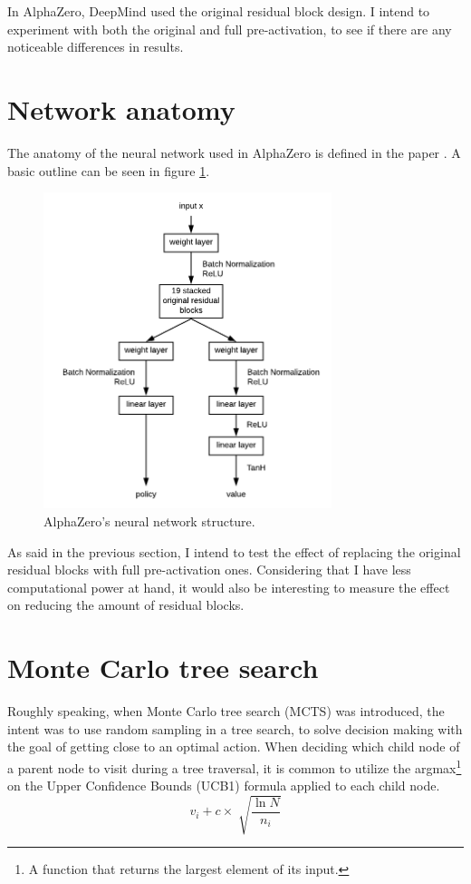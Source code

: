In AlphaZero, DeepMind used the original residual block design. I intend to experiment with both the original and full pre-activation, to see if there are any noticeable differences in results.

\section{Network anatomy}
The anatomy of the neural network used in AlphaZero is defined in the paper \cite{Silver2018}. A basic outline can be seen in figure \ref{fig-network-structure}.

\begin{figure}[ht]
	\centering
	\includegraphics[width=0.75\textwidth]{figures/network-structure}
	\caption{AlphaZero's neural network structure.}
	\label{fig-network-structure}
\end{figure}

As said in the previous section, I intend to test the effect of replacing the original residual blocks with full pre-activation ones. Considering that I have less computational power at hand, it would also be interesting to measure the effect on reducing the amount of residual blocks.

\section{Monte Carlo tree search}
Roughly speaking, when Monte Carlo tree search (MCTS) was introduced, the intent was to use random sampling in a tree search, to solve decision making with the goal of getting close to an optimal action. When deciding which child node of a parent node to visit during a tree traversal, it is common to utilize the argmax\footnote{A function that returns the largest element of its input.} on the Upper Confidence Bounds (UCB1) formula applied to each child node.
\begin{equation}
v_i + c \times \sqrt[]{\frac{\ln{N}}{n_i}}
\label{ucb1}
\end{equation}

